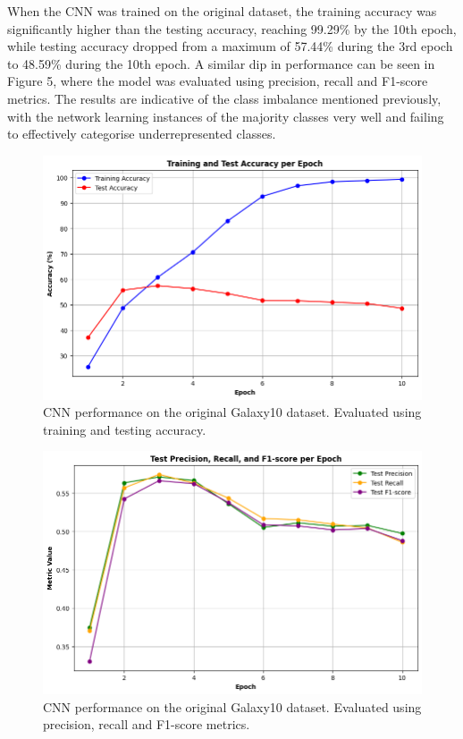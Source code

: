 \documentclass[10pt,twocolumn,letterpaper]{article}
\begin{document}
When the CNN was trained on the original dataset, the training accuracy was significantly higher than the testing accuracy, reaching 99.29\% by the 10th epoch, while testing accuracy dropped from a maximum of 57.44\% during the 3rd epoch to 48.59\% during the 10th epoch.
A similar dip in performance can be seen in Figure 5, where the model was evaluated using precision, recall and F1-score metrics. 
The results are indicative of the class imbalance mentioned previously, with the network learning instances of the majority classes very well and failing to effectively categorise underrepresented classes. 
\begin{figure}[htbp]
    \includegraphics[width=\linewidth]{initial_cnn_acc.png}
    \caption{CNN performance on the original Galaxy10 dataset. Evaluated using training and testing accuracy.}
    \label{fig:initialcnnacc}
  \end{figure}
\begin{figure}[htbp]
    \includegraphics[width=\linewidth]{initial_cnn_metrics.png}
    \caption{CNN performance on the original Galaxy10 dataset. Evaluated using precision, recall and F1-score metrics.}
    \label{fig:initialcnnmet}
  \end{figure}
\end{document}
